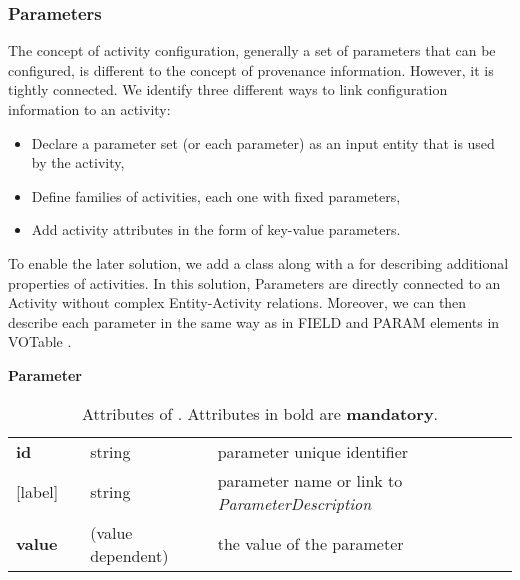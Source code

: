 



\subsubsection{Parameters}

The concept of activity configuration, generally a set of parameters that can be configured, is different to the concept of provenance information. However, it is tightly connected. We identify three different ways to link configuration information to an activity:
\begin{itemize}
\item Declare a parameter set (or each parameter) as an input entity that is used by the activity,
\item Define families of activities, each one with fixed parameters,
\item Add activity attributes in the form of key-value parameters.
\end{itemize}

To enable the later solution, we add a  class along with a  for describing additional properties of activities. In this solution, Parameters are directly connected to an Activity without complex Entity-Activity relations. Moreover, we can then describe each parameter in the same way as in FIELD and PARAM elements in VOTable \citep{std:VOTable}.


\begin{table}[h]
\small
{}\textwidth
\textbf{\normalsize Parameter}\vspace{0.25em}\\
\begin{tabulary}{1.0\textwidth}{@{}p{0cm}p{2.5cm}lL@{}}
\toprule
{} & \head{} &  & \\
\midrule
\textbf{id}      & & string & parameter unique identifier\\
{[label]}         & & string & parameter name or link to \emph{ParameterDescription}\\
\textbf{value}   & & (value dependent) & the value of the parameter\\
\bottomrule
\end{tabulary}
\caption{Attributes of . Attributes in bold are \textbf{mandatory}.}
\end{table}

